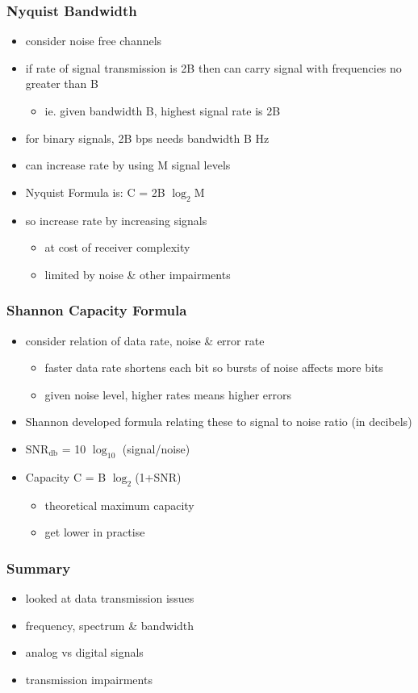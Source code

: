 \documentclass[pdflatex,compress]{beamer}
\begin{document}
\begin{frame}
	\frametitle{Nyquist Bandwidth}
	\begin{itemize}
		\item consider noise free channels
		\item if rate of signal transmission is 2B then can carry signal with frequencies no greater than B 
		\begin{itemize}
			\item ie. given bandwidth B, highest signal rate is 2B
		\end{itemize}
		\item for binary signals, 2B bps needs bandwidth B Hz
		\item can increase rate by using M signal levels
		\item Nyquist Formula is: C = 2B $\log_2$M
		\item so increase rate by increasing signals
		\begin{itemize}
			\item at cost of receiver complexity
			\item limited by noise \& other impairments
		\end{itemize}
	\end{itemize}
\end{frame}

\begin{frame}
	\frametitle{Shannon Capacity Formula}
	\begin{itemize}
		\item consider relation of data rate, noise \& error rate
		\begin{itemize}
			\item faster data rate shortens each bit so bursts of noise affects more bits
			\item given noise level, higher rates means higher errors
		\end{itemize}
		\item Shannon developed formula relating these to signal to noise ratio (in decibels)
		\item $\text{SNR}_{\text{db}}$ = 10 $\log_{10}$ (signal/noise)
		\item Capacity C = B $\log_2$(1+SNR)
		\begin{itemize}
			\item theoretical maximum capacity
			\item get lower in practise
		\end{itemize}
	\end{itemize}
\end{frame}

\begin{frame}
	\frametitle{Summary}
	\begin{itemize}
		\item looked at data transmission issues
		\item frequency, spectrum \& bandwidth
		\item analog vs digital signals
		\item transmission impairments
	\end{itemize}
\end{frame}
\end{document}
